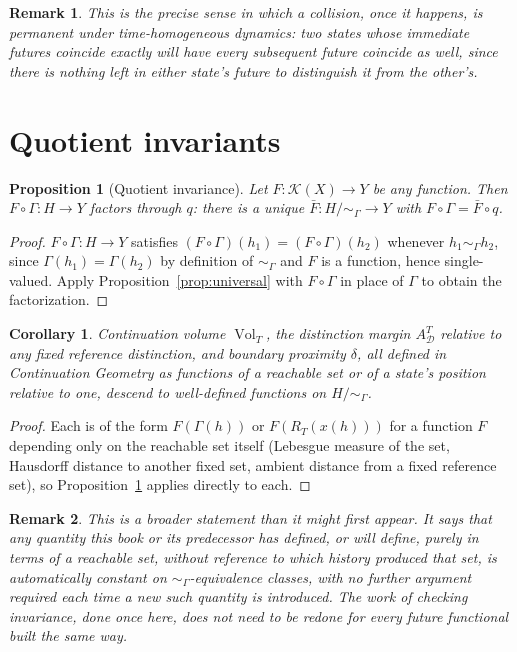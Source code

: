 \documentclass[11pt]{report}
\newtheorem{proposition}{Proposition}[chapter]
\newtheorem{remark}{Remark}[chapter]
\newtheorem{corollary}{Corollary}[chapter]
\begin{document}
\begin{remark}
This is the precise sense in which a collision, once it happens, is
permanent under time-homogeneous dynamics: two states whose immediate
futures coincide exactly will have every subsequent future coincide
as well, since there is nothing left in either state's future to
distinguish it from the other's.
\end{remark}

\section*{Quotient invariants}

\begin{proposition}[Quotient invariance]
\label{prop:invariance}
Let $F : \mathcal{K}(X) \to Y$ be any function. Then
$F \circ \Gamma : H \to Y$ factors through $q$: there is a unique
$\bar{F} : H/{\sim_\Gamma} \to Y$ with $F \circ \Gamma = \bar{F} \circ q$.
\end{proposition}
\begin{proof}
$F \circ \Gamma : H \to Y$ satisfies $(F \circ \Gamma)(h_1) = (F \circ \Gamma)(h_2)$
whenever $h_1 \sim_\Gamma h_2$, since $\Gamma(h_1) = \Gamma(h_2)$ by
definition of $\sim_\Gamma$ and $F$ is a function, hence single-valued.
Apply Proposition~\ref{prop:universal} with $F \circ \Gamma$ in place
of $\Gamma$ to obtain the factorization.
\end{proof}

\begin{corollary}
Continuation volume $\operatorname{Vol}_T$, the distinction margin
$A_{\mathcal D}^T$ relative to any fixed reference distinction, and
boundary proximity $\delta$, all defined in \emph{Continuation
Geometry} as functions of a reachable set or of a state's position
relative to one, descend to well-defined functions on
$H/{\sim_\Gamma}$.
\end{corollary}
\begin{proof}
Each is of the form $F(\Gamma(h))$ or $F(R_T(x(h)))$ for a function
$F$ depending only on the reachable set itself (Lebesgue measure of
the set, Hausdorff distance to another fixed set, ambient distance
from a fixed reference set), so Proposition~\ref{prop:invariance}
applies directly to each.
\end{proof}

\begin{remark}
This is a broader statement than it might first appear. It says that
any quantity this book or its predecessor has defined, or will define,
purely in terms of a reachable set, without reference to which
history produced that set, is automatically constant on
$\sim_\Gamma$-equivalence classes, with no further argument required
each time a new such quantity is introduced. The work of checking
invariance, done once here, does not need to be redone for every
future functional built the same way.
\end{remark}
\end{document}
